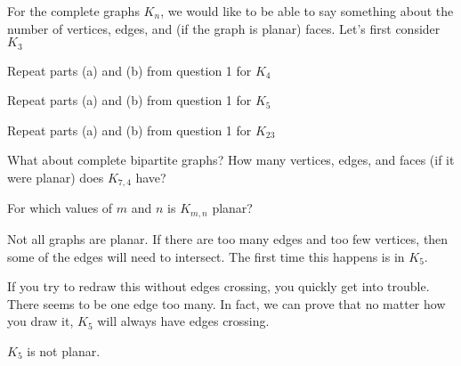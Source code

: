 \documentclass[12pt]{article}
\begin{document}
\begin{activity}
\begin{questions}
\question For the complete graphs $K_n$, we would like to be able to say something about the number of vertices, edges, and (if the graph is planar) faces. Let's first consider $K_3$
\question Repeat parts (a) and (b) from question 1 for $K_4$ 

\question Repeat parts (a) and (b) from question 1 for $K_5$

\question Repeat parts (a) and (b) from question 1 for $K_{23}$


\question What about complete bipartite graphs?  How many vertices, edges, and faces (if it were planar) does $K_{7,4}$ have?

\question For which values of $m$ and $n$ is $K_{m,n}$ planar?
\end{questions}
\end{activity}


Not all graphs are planar.  If there are too many edges and too few vertices, then some of the edges will need to intersect.  The first time this happens is in $K_5$.

\begin{center}
\end{center}

If you try to redraw this without edges crossing, you quickly get into trouble.  There seems to be one edge too many.  In fact, we can prove that no matter how you draw it, $K_5$ will always have edges crossing.

\begin{theorem}
  $K_5$ is not planar.
\end{theorem}
\end{document}
